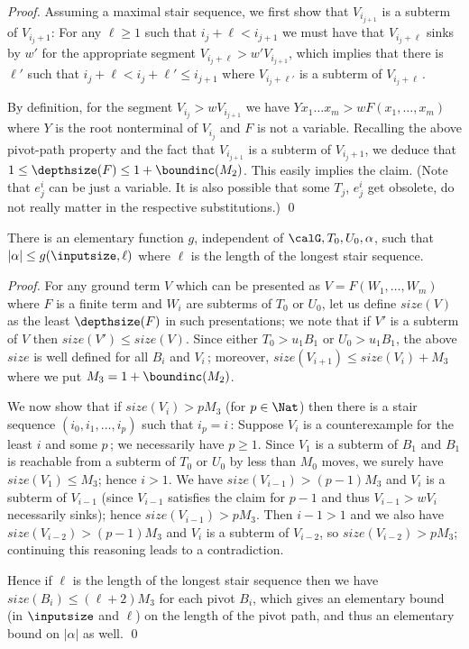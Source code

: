 \documentclass[12pt]{article}
\begin{document}
\begin{proof}
Assuming a maximal stair sequence,
we first show that $V_{i_{j+1}}$ is a subterm of $V_{i_{j}+1}$:
For any $\ell\geq 1$ such that  $i_{j}+\ell<i_{j+1}$ we must have 
that $V_{i_{j}+\ell}$ sinks by $w'$ for the appropriate
segment $V_{i_{j}+\ell}\gt{w'}V_{i_{j+1}}$, which implies that 
there is $\ell'$ such that 
$i_{j}+\ell<i_{j}+\ell'\leq i_{j+1}$ where
 $V_{i_{j}+\ell'}$ is  a subterm of $V_{i_{j}+\ell}$\,.

By definition, for the segment 
$V_{i_j}\gt{w}V_{i_{j+1}}$ we have $Yx_1\dots
x_m\gt{w}F(x_1,\dots,x_m)$ where $Y$ is the root nonterminal of
$V_{i_j}$ and $F$ is not a
variable. Recalling the above pivot-path property and the fact
that   $V_{i_{j+1}}$ is a subterm of $V_{i_{j}+1}$, we deduce that
$1\leq\depthsize(F)\leq 1+\boundinc(M_2)$.
This easily implies the claim.
(Note that $e^i_j$ can be just a variable. It is also possible
that some $T_j$, $e^i_j$ get obsolete, do not really matter in the
respective substitutions.)
\qed
\end{proof}


\begin{prop}
There is an elementary function $g$, independent of $\calG,
T_0,U_0,\alpha$, such that $|\alpha|\leq g(\inputsize,\ell)$
where $\ell$ is the length of the longest stair sequence. 
\end{prop}

\begin{proof}
For any ground term $V$ which can be presented as
$V=F(W_1,\dots,W_m)$ where $F$ is a finite term and  
 $W_i$ are subterms of $T_0$ or $U_0$, let us define
$size(V)$
as the least $\depthsize(F)$ in such presentations;
we note that if $V'$ is a subterm of $V$ then $size(V')\leq size(V)$.
Since either $T_0\gt{u_1}B_1$ or  $U_0\gt{u_1}B_1$, the above $size$ is
well defined for all $B_i$ and $V_i$\,;
moreover,  $size(V_{i+1})\leq  size(V_{i})+M_3$ where we put
$M_3=1+\boundinc(M_2)$.

We now show that 
if $size(V_{i})> p M_3$  (for $p\in\Nat$)
then there is a stair sequence $(i_0,i_1,\dots,i_p)$ such that
$i_p=i$\,:
Suppose $V_i$ is a counterexample for the least $i$ and some $p$\,;
we necessarily
have $p\geq 1$.
Since $V_1$ is a subterm of $B_1$ and $B_1$ is reachable from a
subterm of $T_0$ or $U_0$ by less than $M_0$ moves, we surely 
have $size(V_1)\leq M_3$; hence $i>1$.
We have  $size(V_{i-1})> (p{-}1)M_3$ and
$V_{i}$ is a subterm of $V_{i-1}$ (since $V_{i-1}$ satisfies the claim for
$p-1$ and thus $V_{i-1}\gt{w}V_i$ necessarily sinks); hence
$size(V_{i-1})> p M_3$.  Then $i{-}1>1$ and 
we also have  $size(V_{i-2})> (p{-}1)M_3$ and $V_i$ is a
subterm of $V_{i-2}$, so $size(V_{i-2})> p M_3$; 
continuing this reasoning leads to a contradiction.

Hence if $\ell$  is the length of the longest stair sequence 
then we have $size(B_i)\leq (\ell+2)M_3$ for
each pivot $B_i$, which gives an elementary bound (in $\inputsize$ and
$\ell$) on the length of the pivot path, and thus an elementary bound
on $|\alpha|$ as well.
\qed
\end{proof}
\end{document}
